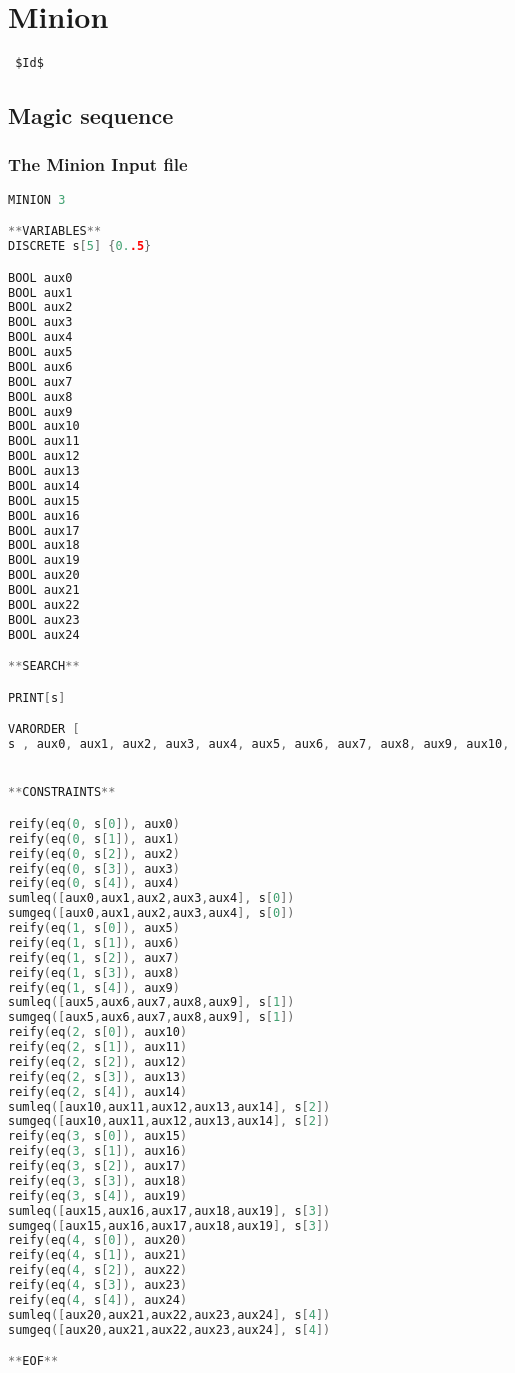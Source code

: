 \section{Minion}
\verb= $Id$ =

\subsection{Magic sequence}
\label{implementation:minion:ms}
\subsubsection{The Minion Input file}
\begin{lstlisting}[language=C++]
MINION 3

**VARIABLES**
DISCRETE s[5] {0..5}

BOOL aux0
BOOL aux1
BOOL aux2
BOOL aux3
BOOL aux4
BOOL aux5
BOOL aux6
BOOL aux7
BOOL aux8
BOOL aux9
BOOL aux10
BOOL aux11
BOOL aux12
BOOL aux13
BOOL aux14
BOOL aux15
BOOL aux16
BOOL aux17
BOOL aux18
BOOL aux19
BOOL aux20
BOOL aux21
BOOL aux22
BOOL aux23
BOOL aux24

**SEARCH**

PRINT[s]

VARORDER [
s , aux0, aux1, aux2, aux3, aux4, aux5, aux6, aux7, aux8, aux9, aux10, aux11, aux12, aux13, aux14, aux15, aux16, aux17, aux18, aux19, aux20, aux21, aux22, aux23, aux24]


**CONSTRAINTS**

reify(eq(0, s[0]), aux0)
reify(eq(0, s[1]), aux1)
reify(eq(0, s[2]), aux2)
reify(eq(0, s[3]), aux3)
reify(eq(0, s[4]), aux4)
sumleq([aux0,aux1,aux2,aux3,aux4], s[0])
sumgeq([aux0,aux1,aux2,aux3,aux4], s[0])
reify(eq(1, s[0]), aux5)
reify(eq(1, s[1]), aux6)
reify(eq(1, s[2]), aux7)
reify(eq(1, s[3]), aux8)
reify(eq(1, s[4]), aux9)
sumleq([aux5,aux6,aux7,aux8,aux9], s[1])
sumgeq([aux5,aux6,aux7,aux8,aux9], s[1])
reify(eq(2, s[0]), aux10)
reify(eq(2, s[1]), aux11)
reify(eq(2, s[2]), aux12)
reify(eq(2, s[3]), aux13)
reify(eq(2, s[4]), aux14)
sumleq([aux10,aux11,aux12,aux13,aux14], s[2])
sumgeq([aux10,aux11,aux12,aux13,aux14], s[2])
reify(eq(3, s[0]), aux15)
reify(eq(3, s[1]), aux16)
reify(eq(3, s[2]), aux17)
reify(eq(3, s[3]), aux18)
reify(eq(3, s[4]), aux19)
sumleq([aux15,aux16,aux17,aux18,aux19], s[3])
sumgeq([aux15,aux16,aux17,aux18,aux19], s[3])
reify(eq(4, s[0]), aux20)
reify(eq(4, s[1]), aux21)
reify(eq(4, s[2]), aux22)
reify(eq(4, s[3]), aux23)
reify(eq(4, s[4]), aux24)
sumleq([aux20,aux21,aux22,aux23,aux24], s[4])
sumgeq([aux20,aux21,aux22,aux23,aux24], s[4])

**EOF**
\end{lstlisting}

